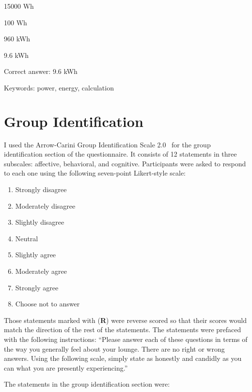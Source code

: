 \begin{answer}
	\item 15000 Wh
	\item 100 Wh
	\item 960 kWh
	\item 9.6 kWh
\end{answer}

Correct answer: 9.6 kWh

Keywords: power, energy, calculation


\section{Group Identification}
\label{group-id-items}

I used the Arrow-Carini Group Identification Scale 2.0~\cite{Henry1999} for the group identification section of the questionnaire. It consists of 12 statements in three subscales: affective, behavioral, and cognitive. Participants were asked to respond to each one using the following seven-point Likert-style scale:

\begin{enumerate}
	\item Strongly disagree
	\item Moderately disagree
	\item Slightly disagree
	\item Neutral
	\item Slightly agree
	\item Moderately agree
	\item Strongly agree
	\item Choose not to answer
\end{enumerate}

Those statements marked with (\textbf{R}) were reverse scored so that their scores would match the direction of the rest of the statements. The statements were prefaced with the following instructions: ``Please answer each of these questions in terms of the way you generally feel about your lounge. There are no right or wrong answers. Using the following scale, simply state as honestly and candidly as you can what you are presently experiencing.''

The statements in the group identification section were:

